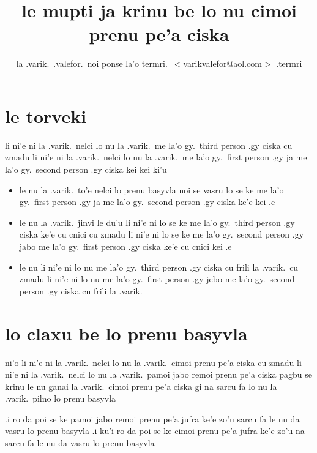 \documentclass{article}
\title{le mupti ja krinu be lo nu cimoi prenu pe'a ciska}
\author{la .varik.\ .valefor.\ noi ponse la'o termri.\ $<$varikvalefor@aol.com$>$ .termri}
\begin{document}
\maketitle

\section{le torveki}
li ni'e ni la .varik.\ nelci lo nu la .varik.\ me la'o gy.\ third person .gy ciska cu zmadu li ni'e ni la .varik.\ nelci lo nu la .varik.\ me la'o gy.\ first person .gy ja me la'o gy.\ second person .gy ciska kei kei ki'u
\begin{itemize}
	\item le nu la .varik.\ to'e nelci lo prenu basyvla noi se vasru lo se ke me la'o gy.\ first person .gy ja me la'o gy.\ second person .gy ciska ke'e kei .e
	\item le nu la .varik.\ jinvi le du'u li ni'e ni lo se ke me la'o gy.\ third person .gy ciska ke'e cu cnici cu zmadu li ni'e ni lo se ke me la'o gy.\ second person .gy jabo me la'o gy.\ first person .gy ciska ke'e cu cnici kei .e
	\item le nu li ni'e ni lo nu me la'o gy.\ third person .gy ciska cu frili la .varik.\ cu zmadu li ni'e ni lo nu me la'o gy.\ first person .gy jebo me la'o gy.\ second person .gy ciska cu frili la .varik.
\end{itemize}

\section{lo claxu be lo prenu basyvla}
ni'o li ni'e ni la .varik.\ nelci lo nu la .varik.\ cimoi prenu pe'a ciska cu zmadu li ni'e ni la .varik.\ nelci lo nu la .varik.\ pamoi jabo remoi prenu pe'a ciska pagbu se krinu le nu ganai la .varik.\ cimoi prenu pe'a ciska gi na sarcu fa lo nu la .varik.\ pilno lo prenu basyvla

.i ro da poi se ke pamoi jabo remoi prenu pe'a jufra ke'e zo'u sarcu fa le nu da vasru lo prenu basyvla  .i ku'i ro da poi se ke cimoi prenu pe'a jufra ke'e zo'u na sarcu fa le nu da vasru lo prenu basyvla
\end{document}
